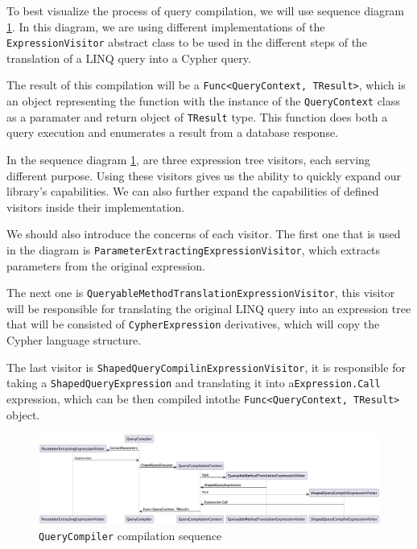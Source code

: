 To best visualize the process of query compilation, we will use sequence diagram \ref{fig:QueryCompilerSequence}.
In this diagram, we are using different implementations of the \texttt{ExpressionVisitor} abstract class to be used in the different steps of the translation of a LINQ query into a Cypher query.

The result of this compilation will be a \texttt{Func<QueryContext, TResult>}, which is an object representing the function with the instance of the \texttt{QueryContext} class as a paramater and return object of \texttt{TResult} type.
This function does both a query execution and enumerates a result from a database response.

In the sequence diagram \ref{fig:QueryCompilerSequence}, are three expression tree visitors, each serving different purpose.
Using these visitors gives us the ability to quickly expand our library's capabilities.
We can also further expand the capabilities of defined visitors inside their implementation.

We should also introduce the concerns of each visitor. The first one that is used in the diagram is \texttt{ParameterExtractingExpressionVisitor},
which extracts parameters from the original expression.

The next one is \texttt{QueryableMethodTranslationExpressionVisitor}, this visitor will
be responsible for translating the original LINQ query into an expression tree that will be consisted of \texttt{CypherExpression} derivatives,
which will copy the Cypher language structure.

The last visitor is \texttt{ShapedQueryCompilinExpressionVisitor}, it is responsible
for taking a \texttt{ShapedQueryExpression} and translating it into a\linebreak \texttt{Expression.Call} expression, which can be then compiled into\linebreak the \texttt{Func<QueryContext, TResult>} object.

\begin{figure}[H]
	\centering
	\includegraphics[width=\textheight, angle=-90]{content/Translation Sequence.png}
	\caption{\texttt{QueryCompiler} compilation sequence}
	\label{fig:QueryCompilerSequence}
\end{figure}

